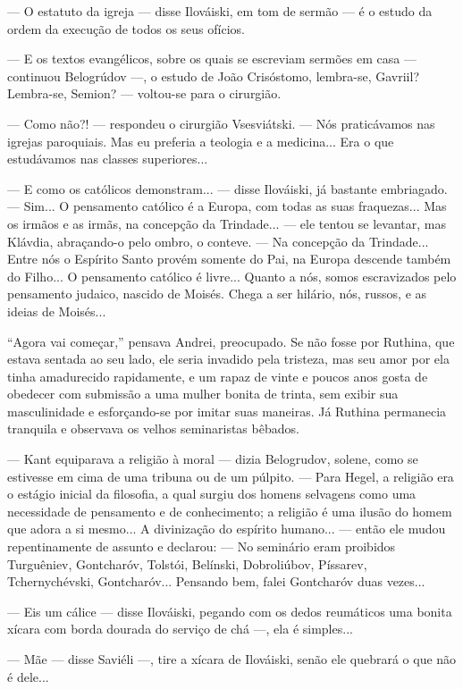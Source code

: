 --- O estatuto da igreja --- disse Ilováiski, em tom de sermão --- é o
estudo da ordem da execução de todos os seus ofícios.

--- E os textos evangélicos, sobre os quais se escreviam sermões em casa
--- continuou Belogrúdov ---, o estudo de João Crisóstomo, lembra-se,
Gavriil? Lembra-se, Semion? --- voltou-se para o cirurgião.

--- Como não?! --- respondeu o cirurgião Vsesviátski. --- Nós
praticávamos nas igrejas paroquiais. Mas eu preferia a teologia e a
medicina... Era o que estudávamos nas classes superiores...

--- E como os católicos demonstram... --- disse Ilováiski, já bastante
embriagado. --- Sim... O pensamento católico é a Europa, com todas as
suas fraquezas... Mas os irmãos e as irmãs, na concepção da Trindade...
--- ele tentou se levantar, mas Klávdia, abraçando-o pelo ombro, o
conteve. --- Na concepção da Trindade... Entre nós o Espírito Santo
provém somente do Pai, na Europa descende também do Filho... O
pensamento católico é livre... Quanto a nós, somos escravizados pelo
pensamento judaico, nascido de Moisés. Chega a ser hilário, nós, russos,
e as ideias de Moisés...

``Agora vai começar,'' pensava Andrei, preocupado. Se não fosse por
Ruthina, que estava sentada ao seu lado, ele seria invadido pela
tristeza, mas seu amor por ela tinha amadurecido rapidamente, e um rapaz
de vinte e poucos anos gosta de obedecer com submissão a uma mulher
bonita de trinta, sem exibir sua masculinidade e esforçando-se por
imitar suas maneiras. Já Ruthina permanecia tranquila e observava os
velhos seminaristas bêbados.

--- Kant equiparava a religião à moral --- dizia Belogrudov, solene,
como se estivesse em cima de uma tribuna ou de um púlpito. --- Para
Hegel, a religião era o estágio inicial da filosofia, a qual surgiu dos
homens selvagens como uma necessidade de pensamento e de conhecimento; a
religião é uma ilusão do homem que adora a si mesmo... A divinização do
espírito humano... --- então ele mudou repentinamente de assunto e
declarou: --- No seminário eram proibidos Turguêniev, Gontcharóv,
Tolstói, Belínski, Dobroliúbov, Píssarev, Tchernychévski, Gontcharóv...
Pensando bem, falei Gontcharóv duas vezes...

--- Eis um cálice --- disse Ilováiski, pegando com os dedos reumáticos
uma bonita xícara com borda dourada do serviço de chá ---, ela é
simples...

--- Mãe --- disse Saviéli ---, tire a xícara de Ilováiski, senão ele
quebrará o que não é dele...

